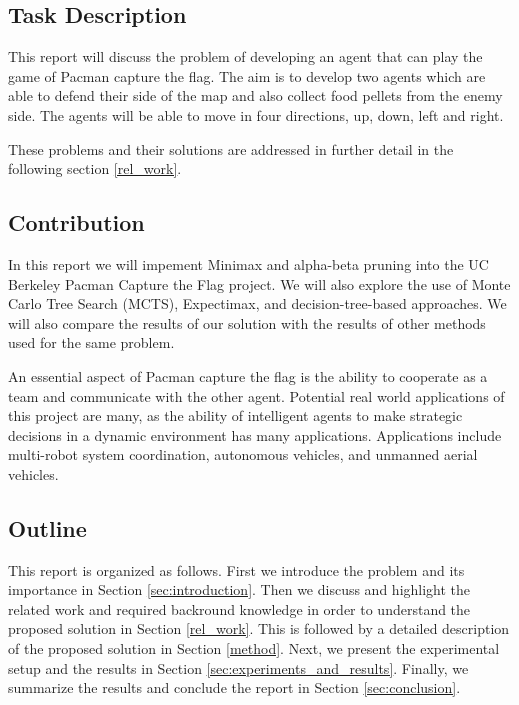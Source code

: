 \documentclass[a4paper,12pt]{article}
\begin{document}
\subsection{Task Description}

This report will discuss the problem of developing an agent that can play the game of Pacman capture the flag. 
The aim is to develop two agents which are able to defend their side of the map and also collect food pellets from the enemy side. 
The agents will be able to move in four directions, up, down, left and right. 




These problems and their solutions are addressed in further detail in the following section \ref{rel_work}.




\subsection{Contribution}

In this report we will impement Minimax and alpha-beta pruning into the UC Berkeley Pacman Capture the Flag project. We will also explore the use of Monte Carlo Tree Search (MCTS), Expectimax, and decision-tree-based approaches.
We will also compare the results of our solution with the results of other methods used for the same problem.

An essential aspect of Pacman capture the flag is the ability to cooperate as a team and communicate with the other agent. 
Potential real world applications of this project are many, as the ability of intelligent agents to make strategic decisions in a dynamic environment has many applications. 
Applications include multi-robot system coordination, autonomous vehicles, and unmanned aerial vehicles.







\subsection{Outline}
This report is organized as follows. First we introduce the problem and its importance in Section \ref{sec:introduction}. Then we discuss and highlight the related work and required backround knowledge in order to understand the proposed solution in Section \ref{rel_work}. This is followed by a detailed description of the proposed solution in Section \ref{method}. Next, we present the experimental setup and the results in Section \ref{sec:experiments_and_results}.
Finally, we summarize the results and conclude the report in Section \ref{sec:conclusion}.
\end{document}
